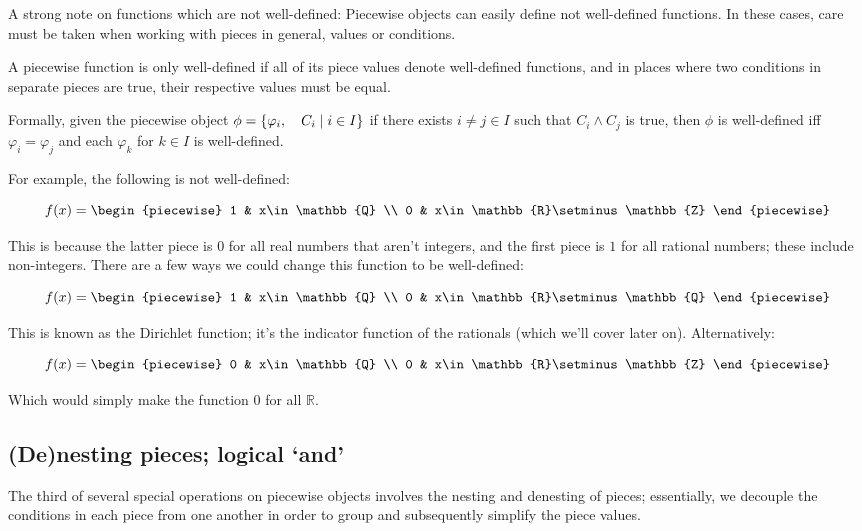 A strong note on functions which are not well-defined: Piecewise objects can easily define not well-defined functions. In these cases, care must be taken when working with pieces in general, values or conditions. 

\begin{theorem}
    A piecewise function is only well-defined if all of its piece values denote well-defined functions, and in places where two conditions in separate pieces are true, their respective values must be equal.

    Formally, given the piecewise object $\phi=\{\varphi_i,\quad C_i\mid i\in I\}$ if there exists $i\neq j\in I$ such that $C_i\land C_j$ is true, then $\phi$ is well-defined iff $\varphi_i=\varphi_j$ and each $\varphi_k$ for $k\in I$ is well-defined.

    For example, the following is not well-defined:

    $$
        f(x) = \begin{piecewise}
            1 & x\in\mathbb{Q} \\
            0 & x\in\mathbb{R}\setminus\mathbb{Z}
        \end{piecewise}
    $$

    This is because the latter piece is $0$ for all real numbers that aren't integers, and the first piece is $1$ for all rational numbers; these include non-integers. There are a few ways we could change this function to be well-defined:
    
    $$
        f(x) = \begin{piecewise}
            1 & x\in\mathbb{Q} \\
            0 & x\in\mathbb{R}\setminus\mathbb{Q}
        \end{piecewise}
    $$

    This is known as the Dirichlet function; it's the indicator function of the rationals (which we'll cover later on). Alternatively:

    $$
        f(x) = \begin{piecewise}
            0 & x\in\mathbb{Q} \\
            0 & x\in\mathbb{R}\setminus\mathbb{Z}
        \end{piecewise}
    $$

    Which would simply make the function $0$ for all $\mathbb{R}$.
\end{theorem}

\subsection{(De)nesting pieces; logical `and'}
The third of several special operations on piecewise objects involves the nesting and denesting of pieces; essentially, we decouple the conditions in each piece from one another in order to group and subsequently simplify the piece values.

